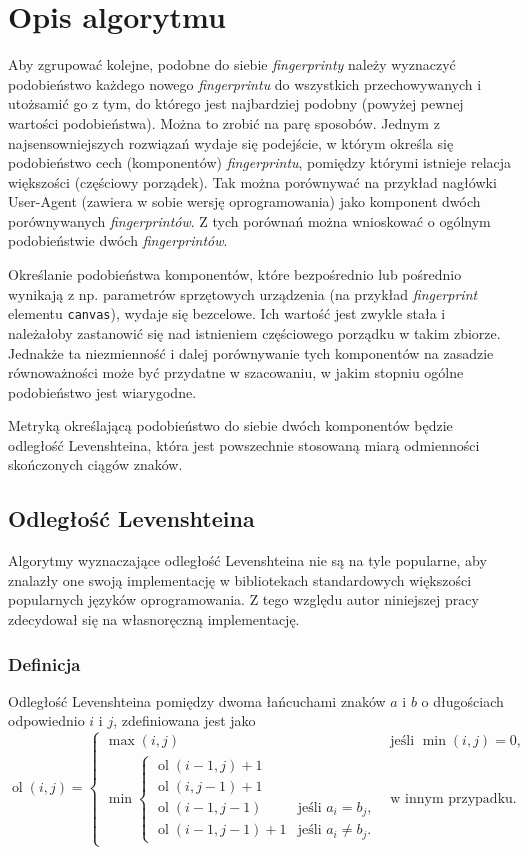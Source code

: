\section{Opis algorytmu}
Aby zgrupować kolejne, podobne do siebie \emph{fingerprinty} należy wyznaczyć
podobieństwo każdego nowego \emph{fingerprintu} do wszystkich przechowywanych i
utożsamić go z tym, do którego jest najbardziej podobny (powyżej pewnej wartości
podobieństwa). Można to zrobić na parę sposobów. Jednym z najsensowniejszych
rozwiązań wydaje się podejście, w którym określa się podobieństwo cech
(komponentów) \emph{fingerprintu}, pomiędzy którymi istnieje relacja większości
(częściowy porządek). Tak można porównywać na przykład nagłówki User-Agent
(zawiera w sobie wersję oprogramowania) jako komponent dwóch porównywanych
\emph{fingerprintów}. Z tych porównań można wnioskować o ogólnym podobieństwie
dwóch \emph{fingerprintów}.

Określanie podobieństwa komponentów, które bezpośrednio lub pośrednio wynikają z
np. parametrów sprzętowych urządzenia (na przykład \emph{fingerprint} elementu
\texttt{canvas}), wydaje się bezcelowe. Ich wartość jest zwykle stała i
należałoby zastanowić się nad istnieniem częściowego porządku w takim zbiorze.
Jednakże ta niezmienność i dalej porównywanie tych komponentów na zasadzie
równoważności może być przydatne w szacowaniu, w jakim stopniu ogólne
podobieństwo jest wiarygodne.

Metryką określającą podobieństwo do siebie dwóch komponentów będzie odległość
Levenshteina, która jest powszechnie stosowaną miarą odmienności skończonych
ciągów znaków.

\subsection{Odległość Levenshteina}
Algorytmy wyznaczające odległość Levenshteina nie są na tyle popularne, aby
znalazły one swoją implementację w bibliotekach standardowych większości
popularnych języków oprogramowania. Z tego względu autor niniejszej pracy
zdecydował się na własnoręczną implementację.

\subsubsection{Definicja}
Odległość Levenshteina pomiędzy dwoma łańcuchami znaków \(a\) i \(b\) o
długościach odpowiednio \(i\) i \(j\), zdefiniowana jest jako
\begin{displaymath}
	\operatorname{ol}(i,j)=
	\begin{cases}
		\max(i,j)                    & \text{jeśli }\min(i,j)=0,  \\
		\min
		\begin{cases}
		\operatorname{ol}(i-1,j)+1 \\
		\operatorname{ol}(i,j-1)+1 \\
		\operatorname{ol}(i-1,j-1)   & \text{jeśli }a_i=b_j,      \\
		\operatorname{ol}(i-1,j-1)+1 & \text{jeśli }a_i \neq b_j. 
	\end{cases} & \text{w innym przypadku}.
	\end{cases}
\end{displaymath}

